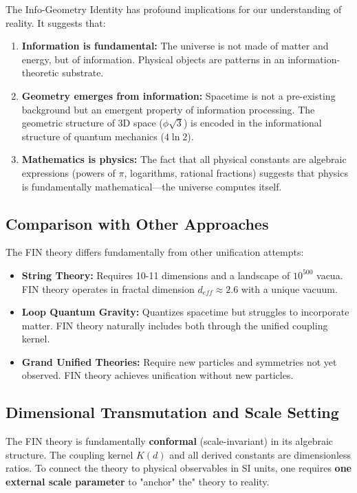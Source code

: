 \documentclass[11pt, a4paper]{article}
\begin{document}
The Info-Geometry Identity has profound implications for our understanding of reality. It suggests that:

\begin{enumerate}
    \item \textbf{Information is fundamental:} The universe is not made of matter and energy, but of information. Physical objects are patterns in an information-theoretic substrate.
    \item \textbf{Geometry emerges from information:} Spacetime is not a pre-existing background but an emergent property of information processing. The geometric structure of 3D space ($\phi\sqrt{3}$) is encoded in the informational structure of quantum mechanics ($4\ln 2$).
    \item \textbf{Mathematics is physics:} The fact that all physical constants are algebraic expressions (powers of $\pi$, logarithms, rational fractions) suggests that physics is fundamentally mathematical—the universe computes itself.
\end{enumerate}

\subsection{Comparison with Other Approaches}

The FIN theory differs fundamentally from other unification attempts:

\begin{itemize}
    \item \textbf{String Theory:} Requires 10-11 dimensions and a landscape of $10^{500}$ vacua. FIN theory operates in fractal dimension $d_{eff} \approx 2.6$ with a unique vacuum.
    \item \textbf{Loop Quantum Gravity:} Quantizes spacetime but struggles to incorporate matter. FIN theory naturally includes both through the unified coupling kernel.
    \item \textbf{Grand Unified Theories:} Require new particles and symmetries not yet observed. FIN theory achieves unification without new particles.
\end{itemize}

\subsection{Dimensional Transmutation and Scale Setting}

The FIN theory is fundamentally \textbf{conformal} (scale-invariant) in its algebraic structure. The coupling kernel $K(d)$ and all derived constants are dimensionless ratios. To connect the theory to physical observables in SI units, one requires \textbf{one external scale parameter} to "anchor" the" theory to reality.
\end{document}
